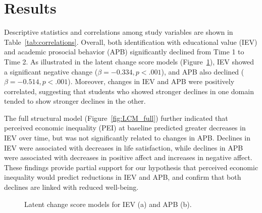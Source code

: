 \section{Results}

Descriptive statistics and correlations among study variables are shown in Table~\ref{tab:correlations}. Overall, both identification with educational value (IEV) and academic prosocial behavior (APB) significantly declined from Time 1 to Time 2. As illustrated in the latent change score models (Figure~\ref{fig:LCM_simple}), IEV showed a significant negative change ($\beta = -0.334, p < .001$), and APB also declined ($\beta = -0.514, p < .001$). Moreover, changes in IEV and APB were positively correlated, suggesting that students who showed stronger declines in one domain tended to show stronger declines in the other.  

The full structural model (Figure~\ref{fig:LCM_full}) further indicated that perceived economic inequality (PEI) at baseline predicted greater decreases in IEV over time, but was not significantly related to changes in APB. Declines in IEV were associated with decreases in life satisfaction, while declines in APB were associated with decreases in positive affect and increases in negative affect. These findings provide partial support for our hypothesis that perceived economic inequality would predict reductions in IEV and APB, and confirm that both declines are linked with reduced well-being.  

\begin{figure}[htbp]
\centering
{}
\caption{Latent change score models for IEV (a) and APB (b).}
\label{fig:LCM_simple}
\end{figure}


